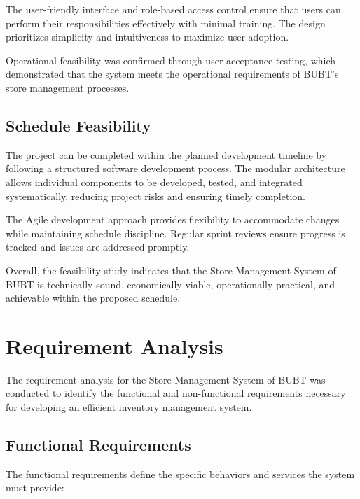 The user-friendly interface and role-based access control ensure that users can perform their responsibilities effectively with minimal training. The design prioritizes simplicity and intuitiveness to maximize user adoption.

Operational feasibility was confirmed through user acceptance testing, which demonstrated that the system meets the operational requirements of BUBT's store management processes.

\subsection{Schedule Feasibility}

The project can be completed within the planned development timeline by following a structured software development process. The modular architecture allows individual components to be developed, tested, and integrated systematically, reducing project risks and ensuring timely completion.

The Agile development approach provides flexibility to accommodate changes while maintaining schedule discipline. Regular sprint reviews ensure progress is tracked and issues are addressed promptly.

Overall, the feasibility study indicates that the Store Management System of BUBT is technically sound, economically viable, operationally practical, and achievable within the proposed schedule.

\section{Requirement Analysis}

The requirement analysis for the Store Management System of BUBT was conducted to identify the functional and non-functional requirements necessary for developing an efficient inventory management system.

\subsection{Functional Requirements}

The functional requirements define the specific behaviors and services the system must provide:

